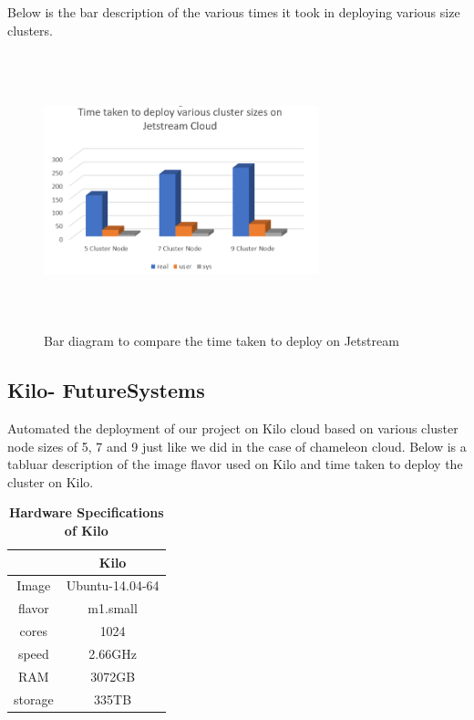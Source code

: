 \documentclass[9pt,twocolumn,twoside]{../../styles/osajnl}
\begin{document}
Below is the bar description of the various times it took in deploying various size clusters.

\begin{figure}[!htb]
  \includegraphics[width=8cm,height=8cm,keepaspectratio,width=\linewidth]{images/bar-2.png}
  \caption{Bar diagram to compare the time taken to deploy on Jetstream }
  \label{Bar diagram to compare the time taken to deploy on Jetstream}
\end{figure}


\subsection{Kilo- FutureSystems}

Automated the deployment of our project  on Kilo cloud based on various cluster node sizes of 5, 7 and 9 just like we did in the case of chameleon cloud. Below is a tabluar description of the image flavor used on Kilo and time taken to deploy the cluster on Kilo.


\begin{table}[htbp]
\centering
\caption{\bf Hardware Specifications of Kilo}

 \begin{tabular} {| c | c |}
\hline
  & Kilo   \\ [0.5ex] 
 \hline
Image   & Ubuntu-14.04-64  \\
\hline
flavor  & m1.small  \\
 \hline
cores & 1024   \\
 \hline
speed & 2.66GHz \\
 \hline
RAM   & 3072GB  \\
 \hline
storage & 335TB  \\ [1ex] 
 \hline

\end{tabular}
  \label{tab:cloud-comparison}
\end{table}
\end{document}
